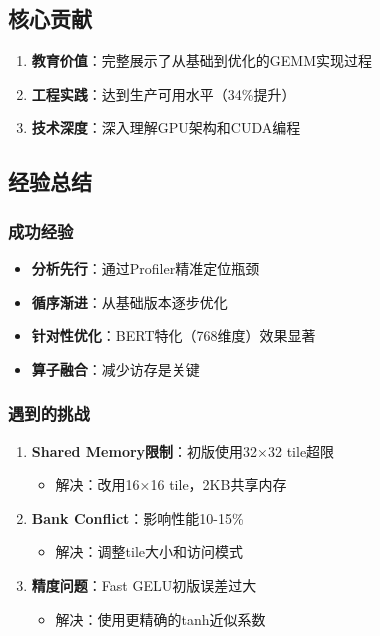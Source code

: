 \documentclass[12pt,a4paper]{article}
\begin{document}
\subsection{核心贡献}

\begin{enumerate}
    \item \textbf{教育价值}：完整展示了从基础到优化的GEMM实现过程
    \item \textbf{工程实践}：达到生产可用水平（34\%提升）
    \item \textbf{技术深度}：深入理解GPU架构和CUDA编程
\end{enumerate}

\subsection{经验总结}

\subsubsection{成功经验}

\begin{itemize}
    \item \textbf{分析先行}：通过Profiler精准定位瓶颈
    \item \textbf{循序渐进}：从基础版本逐步优化
    \item \textbf{针对性优化}：BERT特化（768维度）效果显著
    \item \textbf{算子融合}：减少访存是关键
\end{itemize}

\subsubsection{遇到的挑战}

\begin{enumerate}
    \item \textbf{Shared Memory限制}：初版使用32×32 tile超限
    \begin{itemize}
        \item 解决：改用16×16 tile，2KB共享内存
    \end{itemize}
    
    \item \textbf{Bank Conflict}：影响性能10-15\%
    \begin{itemize}
        \item 解决：调整tile大小和访问模式
    \end{itemize}
    
    \item \textbf{精度问题}：Fast GELU初版误差过大
    \begin{itemize}
        \item 解决：使用更精确的tanh近似系数
    \end{itemize}
\end{enumerate}
\end{document}
